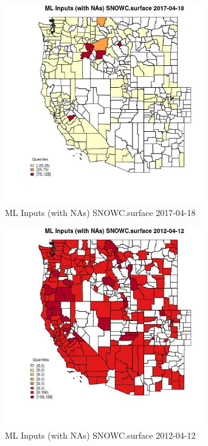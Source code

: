 \begin{figure} 
\centering  
\includegraphics[width=0.77\textwidth]{Code_Outputs/Report_ML_input_PM25_Step4_part_e_de_duplicated_aves_compiled_2019-05-14wNAs_CountySNOWCsurfaceMean2017-04-18_2017-04-18.jpg} 
\caption{\label{fig:Report_ML_input_PM25_Step4_part_e_de_duplicated_aves_compiled_2019-05-14wNAsCountySNOWCsurfaceMean2017-04-18_2017-04-18}ML Inputs (with NAs) SNOWC.surface 2017-04-18} 
\end{figure} 
 

\begin{figure} 
\centering  
\includegraphics[width=0.77\textwidth]{Code_Outputs/Report_ML_input_PM25_Step4_part_e_de_duplicated_aves_compiled_2019-05-14wNAs_CountySNOWCsurfaceMean2012-04-12_2012-04-12.jpg} 
\caption{\label{fig:Report_ML_input_PM25_Step4_part_e_de_duplicated_aves_compiled_2019-05-14wNAsCountySNOWCsurfaceMean2012-04-12_2012-04-12}ML Inputs (with NAs) SNOWC.surface 2012-04-12} 
\end{figure} 
 

